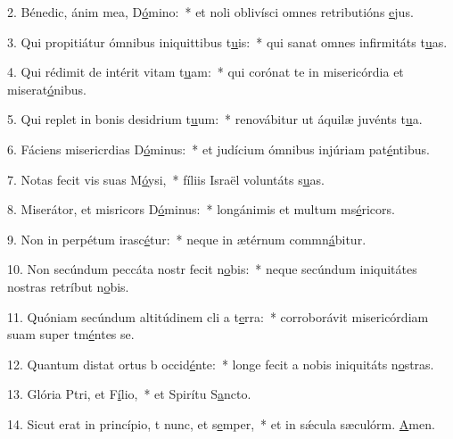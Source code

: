 2. Bénedic, ánim mea, D\uline{ó}mino:~* et noli oblivísci omnes retributións \uline{e}jus.\par 
3. Qui propitiátur ómnibus iniquittibus t\uline{u}is:~* qui sanat omnes infirmitáts t\uline{u}as.\par 
4. Qui rédimit de intérit vitam t\uline{u}am:~* qui corónat te in misericórdia et miserat\uline{ó}nibus.\par 
5. Qui replet in bonis desidrium t\uline{u}um:~* renovábitur ut áquilæ juvénts t\uline{u}a.\par 
6. Fáciens misericrdias D\uline{ó}minus:~* et judícium ómnibus injúriam pat\uline{é}ntibus.\par 
7. Notas fecit vis suas M\uline{ó}ysi,~* fíliis Israël voluntáts s\uline{u}as.\par 
8. Miserátor, et misricors D\uline{ó}minus:~* longánimis et multum ms\uline{é}ricors.\par 
9. Non in perpétum irasc\uline{é}tur:~* neque in ætérnum commn\uline{á}bitur.\par 
10. Non secúndum peccáta nostr fecit n\uline{o}bis:~* neque secúndum iniquitátes nostras retríbut n\uline{o}bis.\par 
11. Quóniam secúndum altitúdinem cli a t\uline{e}rra:~* corroborávit misericórdiam suam super tm\uline{é}ntes se.\par 
12. Quantum distat ortus b occid\uline{é}nte:~* longe fecit a nobis iniquitáts n\uline{o}stras.\par 
13. Glória Ptri, et F\uline{í}lio,~* et Spirítu S\uline{a}ncto.\par 
14. Sicut erat in princípio, t nunc, et s\uline{e}mper,~* et in sǽcula sæculórm. \uline{A}men.\par 
